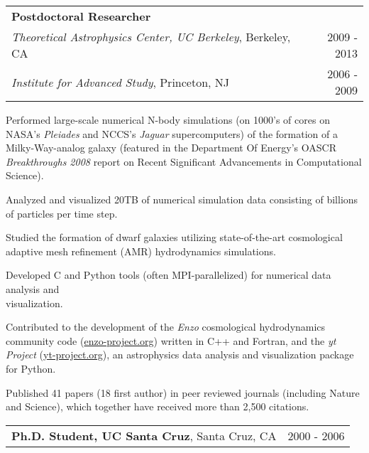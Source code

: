 \begin{resume}
\vspace*{-0.05in}
\hspace*{-0.1in}
\begin{tabularx}{1.025\textwidth}{Xr}
\textbf{Postdoctoral Researcher} & \\
\hspace{0.25in} \textit{Theoretical Astrophysics Center, UC Berkeley}, Berkeley, CA & 2009 - 2013 \\
\hspace{0.25in} \textit{Institute for Advanced Study}, Princeton, NJ & 2006 - 2009 \\
\end{tabularx}
\begin{list1}
\item Performed large-scale numerical N-body simulations (on 1000's of cores on NASA's \textit{Pleiades} and NCCS's \textit{Jaguar} supercomputers) of the formation of a Milky-Way-analog galaxy (featured in the Department Of Energy's OASCR \textit{Breakthroughs 2008} report on Recent Significant Advancements in Computational Science).
\item Analyzed and visualized 20TB of numerical simulation data consisting of billions of particles per time step.
\item Studied the formation of dwarf galaxies utilizing state-of-the-art cosmological adaptive mesh refinement (AMR) hydrodynamics simulations.
\item Developed C and Python tools (often MPI-parallelized) for numerical data analysis and \\ visualization.
\item Contributed to the development of the \textit{Enzo} cosmological hydrodynamics community code (\url{enzo-project.org}) written in C++ and Fortran, and the \textit{yt Project} (\url{yt-project.org}), an astrophysics data analysis and visualization package for Python.
\item Published 41 papers (18 first author) in peer reviewed journals (including Nature and Science), which together have received more than 2,500 citations.
\end{list1}

\vspace*{-0.05in}
\hspace*{-0.1in}
\begin{tabularx}{1.025\textwidth}{Xr}
\textbf{Ph.D. Student, UC Santa Cruz}, Santa Cruz, CA & 2000 - 2006
\end{tabularx}
\vspace*{-0.1in}
\begin{list1}


\end{list1}
\end{resume}
